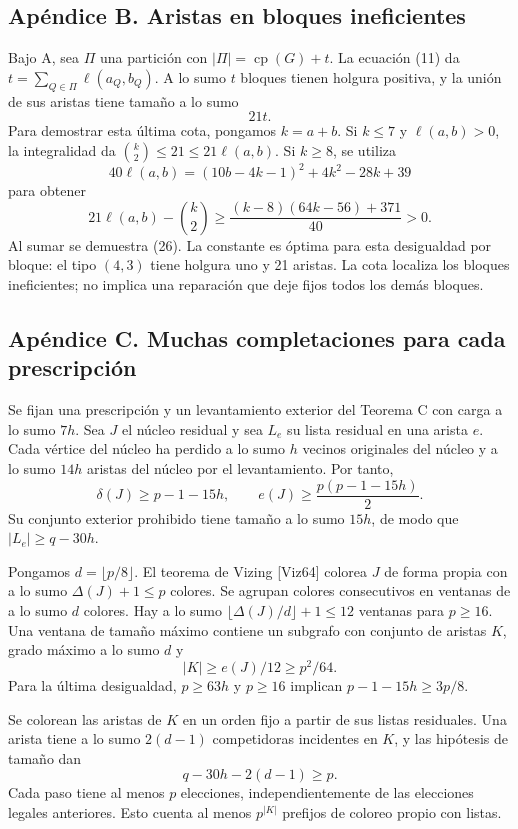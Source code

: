 \documentclass[spanish,11pt,a4paper]{article}
\begin{document}
\subsection{Apéndice B. Aristas en bloques
ineficientes}\label{apuxe9ndice-b.-aristas-en-bloques-ineficientes}

Bajo A, sea \(\Pi\) una partición con \(|\Pi|=\operatorname{cp}(G)+t\).
La ecuación (11) da \(t=\sum_{Q\in\Pi}\ell(a_Q,b_Q)\). A lo sumo \(t\)
bloques tienen holgura positiva, y la unión de sus aristas tiene tamaño
a lo sumo \[
21t. \tag{26}
\] Para demostrar esta última cota, pongamos \(k=a+b\). Si \(k\le7\) y
\(\ell(a,b)>0\), la integralidad da \(\binom k2\le21\le21\ell(a,b)\). Si
\(k\ge8\), se utiliza \[
40\ell(a,b)=(10b-4k-1)^2+4k^2-28k+39
\] para obtener \[
21\ell(a,b)-\binom k2
\ge\frac{(k-8)(64k-56)+371}{40}>0.
\] Al sumar se demuestra (26). La constante es óptima para esta
desigualdad por bloque: el tipo \((4,3)\) tiene holgura uno y 21
aristas. La cota localiza los bloques ineficientes; no implica una
reparación que deje fijos todos los demás bloques.

\subsection{Apéndice C. Muchas completaciones para cada
prescripción}\label{apuxe9ndice-c.-muchas-completaciones-para-cada-prescripciuxf3n}

Se fijan una prescripción y un levantamiento exterior del Teorema C con
carga a lo sumo \(7h\). Sea \(J\) el núcleo residual y sea \(L_e\) su
lista residual en una arista \(e\). Cada vértice del núcleo ha perdido a
lo sumo \(h\) vecinos originales del núcleo y a lo sumo \(14h\) aristas
del núcleo por el levantamiento. Por tanto, \[
\delta(J)\ge p-1-15h,\qquad
e(J)\ge\frac{p(p-1-15h)}2.
\] Su conjunto exterior prohibido tiene tamaño a lo sumo \(15h\), de
modo que \(|L_e|\ge q-30h\).

Pongamos \(d=\lfloor p/8\rfloor\). El teorema de Vizing {[}Viz64{]}
colorea \(J\) de forma propia con a lo sumo \(\Delta(J)+1\le p\)
colores. Se agrupan colores consecutivos en ventanas de a lo sumo \(d\)
colores. Hay a lo sumo \(\lfloor\Delta(J)/d\rfloor+1\le12\) ventanas
para \(p\ge16\). Una ventana de tamaño máximo contiene un subgrafo con
conjunto de aristas \(K\), grado máximo a lo sumo \(d\) y \[
|K|\ge e(J)/12\ge p^2/64.
\] Para la última desigualdad, \(p\ge63h\) y \(p\ge16\) implican
\(p-1-15h\ge3p/8\).

Se colorean las aristas de \(K\) en un orden fijo a partir de sus listas
residuales. Una arista tiene a lo sumo \(2(d-1)\) competidoras
incidentes en \(K\), y las hipótesis de tamaño dan \[
q-30h-2(d-1)\ge p.
\] Cada paso tiene al menos \(p\) elecciones, independientemente de las
elecciones legales anteriores. Esto cuenta al menos \(p^{|K|}\) prefijos
de coloreo propio con listas.
\end{document}
